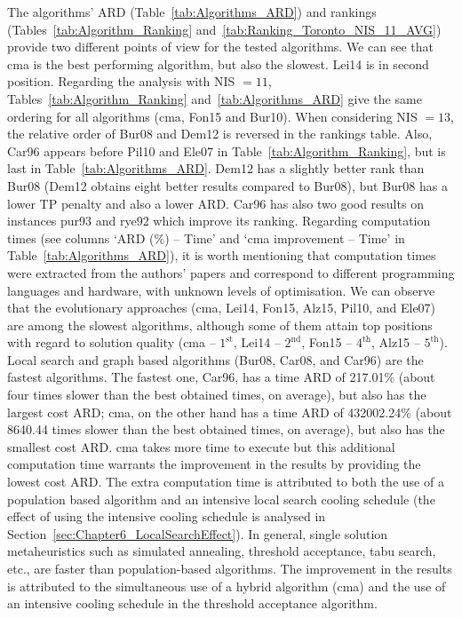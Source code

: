 The algorithms' ARD (Table~\ref{tab:Algorithms_ARD}) and rankings (Tables~\ref{tab:Algorithm_Ranking} and~\ref{tab:Ranking_Toronto_NIS_11_AVG}) provide two different points of view for the tested algorithms. We can see that \gls{cma} is the best performing algorithm, but also the slowest. Lei14 is in second position. Regarding the analysis with NIS $=11$, Tables~\ref{tab:Algorithm_Ranking} and~\ref{tab:Algorithms_ARD} give the same ordering for all algorithms (\gls{cma}, Fon15 and Bur10). When considering NIS $=13$, the relative order of Bur08 and Dem12 is reversed in the rankings table. Also, Car96 appears before Pil10 and Ele07 in Table~\ref{tab:Algorithm_Ranking}, but is last in Table~\ref{tab:Algorithms_ARD}. Dem12 has a slightly better rank than Bur08 (Dem12 obtains eight better results compared to Bur08), but Bur08 has a lower TP penalty and also a lower ARD. Car96 has also two good results on instances pur93 and rye92 which improve its ranking. Regarding computation times (see columns `ARD (\%) -- Time' and `\gls{cma} improvement -- Time' in Table~\ref{tab:Algorithms_ARD}), it is worth mentioning that computation times were extracted from the authors' papers and correspond to different programming languages and hardware, with unknown levels of optimisation. We can observe that the evolutionary approaches (\gls{cma}, Lei14, Fon15, Alz15, Pil10, and Ele07) are among the slowest algorithms, although some of them attain top positions with regard to solution quality (\gls{cma} -- $1^{\text{st}}$, Lei14 -- $2^{\text{nd}}$, Fon15 -- $4^{\text{th}}$, Alz15 -- $5^{\text{th}}$). Local search and graph based algorithms (Bur08, Car08, and Car96) are the fastest algorithms. The fastest one, Car96, has a time ARD of 217.01\% (about four times slower than the best obtained times, on average), but also has the largest cost ARD; \gls{cma}, on the other hand has a time ARD of \num{432002.24}\% (about \num{8640.44} times slower than the best obtained times, on average), but also has the smallest cost ARD. \gls{cma} takes more time to execute but this additional computation time warrants the improvement in the results by providing the lowest cost ARD. The extra computation time is attributed to both the use of a population based algorithm and an intensive local search cooling schedule (the effect of using the intensive cooling schedule is analysed in Section~\ref{sec:Chapter6_LocalSearchEffect}). In general, single solution metaheuristics such as simulated annealing, threshold acceptance, tabu search, etc., are faster than population-based algorithms. The improvement in the results is attributed to the simultaneous use of a hybrid algorithm (\gls{cma}) and the use of an intensive cooling schedule in the threshold acceptance algorithm.




